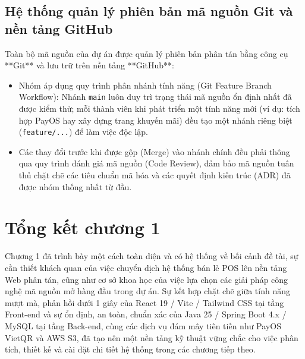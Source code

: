 \subsection{Hệ thống quản lý phiên bản mã nguồn Git và nền tảng GitHub}
Toàn bộ mã nguồn của dự án được quản lý phiên bản phân tán bằng công cụ **Git** và lưu trữ trên nền tảng **GitHub**:
\begin{itemize}[leftmargin=1.5cm]
    \item Nhóm áp dụng quy trình phân nhánh tính năng (Git Feature Branch Workflow): Nhánh \texttt{main} luôn duy trì trạng thái mã nguồn ổn định nhất đã được kiểm thử; mỗi thành viên khi phát triển một tính năng mới (ví dụ: tích hợp PayOS hay xây dựng trang khuyến mãi) đều tạo một nhánh riêng biệt (\texttt{feature/...}) để làm việc độc lập.
    \item Các thay đổi trước khi được gộp (Merge) vào nhánh chính đều phải thông qua quy trình đánh giá mã nguồn (Code Review), đảm bảo mã nguồn tuân thủ chặt chẽ các tiêu chuẩn mã hóa và các quyết định kiến trúc (ADR) đã được nhóm thống nhất từ đầu.
\end{itemize}

\section{Tổng kết chương 1}
Chương 1 đã trình bày một cách toàn diện và có hệ thống về bối cảnh đề tài, sự cần thiết khách quan của việc chuyển dịch hệ thống bán lẻ POS lên nền tảng Web phân tán, cũng như cơ sở khoa học của việc lựa chọn các giải pháp công nghệ mã nguồn mở hàng đầu trong dự án. Sự kết hợp chặt chẽ giữa tính năng mượt mà, phản hồi dưới 1 giây của React 19 / Vite / Tailwind CSS tại tầng Front-end và sự ổn định, an toàn, chuẩn xác của Java 25 / Spring Boot 4.x / MySQL tại tầng Back-end, cùng các dịch vụ đám mây tiên tiến như PayOS VietQR và AWS S3, đã tạo nên một nền tảng kỹ thuật vững chắc cho việc phân tích, thiết kế và cài đặt chi tiết hệ thống trong các chương tiếp theo.

